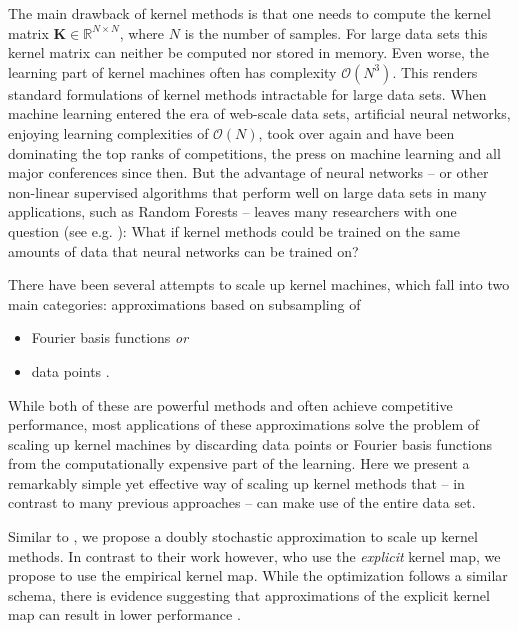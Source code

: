 \documentclass{article} %
\newcommand{\R}{\ensuremath{\mathds{R}}}
\renewcommand{\vec}[1]{\mathbf{#1}}
\newcommand{\felix}[1]{\textcolor{blue}{{\bf Felix:} #1}}
\begin{document}
The main drawback of kernel methods is that one needs to compute the kernel matrix $\vec{K}\in\R^{N\times N}$, where $N$ is the number of samples. For large data sets this kernel matrix can neither be computed nor stored in memory. Even worse, the learning part of kernel machines often has complexity $\mathcal{O}(N^3)$. This renders standard formulations of kernel methods intractable for large data sets. When machine learning entered the era of web-scale data sets, artificial neural networks, enjoying learning complexities of $\mathcal{O}(N)$, took over again and have been dominating the top ranks of competitions, the press on machine learning and all major conferences since then. But the advantage of neural networks -- or other non-linear supervised algorithms that perform well on large data sets in many applications, such as Random Forests \cite{Breiman2001} -- leaves many researchers with one question (see e.g. \cite{Lu2014}): What if kernel methods could be trained on the same amounts of data that neural networks can be trained on? 

There have been several attempts to scale up kernel machines, which fall into two main categories: approximations based on subsampling of
%
\begin{itemize}
\item Fourier basis functions \cite{Rahimi2008} {\em or}
\item data points \cite{Williams2000}.
\end{itemize}
%
While both of these are powerful methods and often achieve competitive performance, most applications of these approximations solve the problem of scaling up kernel machines by discarding data points or Fourier basis functions from the computationally expensive part of the learning. Here we present a remarkably simple yet effective way of scaling up kernel methods that -- in contrast to many previous approaches -- can make use of the entire data set. 

Similar to \cite{Dai2014}, we propose a doubly stochastic approximation to scale up kernel methods. In contrast to their work however, who use the {\em explicit} kernel map, we propose to use the empirical kernel map. While the optimization follows a similar schema, there is evidence suggesting that approximations of the explicit kernel map can result in lower performance \cite{Yang2012}.
\end{document}
